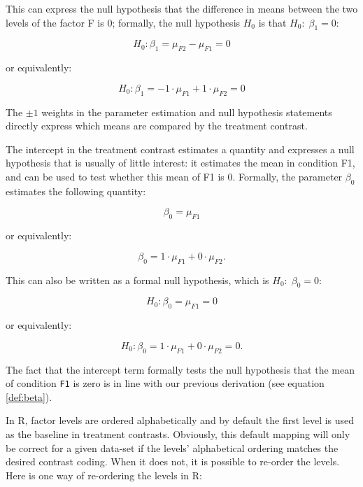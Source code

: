 \documentclass[12pt,]{krantz}
\theoremstyle{definition}
\theoremstyle{definition}
\theoremstyle{definition}
\theoremstyle{remark}
\begin{document}
This can express the null hypothesis that the difference in means
between the two levels of the factor F is \(0\); formally, the null
hypothesis \(H_0\) is that \(H_0: \; \beta_1 = 0\):

\begin{equation} \label{eq:f2minusf1}
H_0: \beta_1 = \mu_{F2} - \mu_{F1} = 0
\end{equation}

or equivalently:

\begin{equation}
H_0: \beta_1 = - 1 \cdot \mu_{F1} + 1 \cdot \mu_{F2} = 0
\end{equation}

The \(\pm 1\) weights in the parameter estimation and null hypothesis
statements directly express which means are compared by the treatment
contrast.

The intercept in the treatment contrast estimates a quantity and
expresses a null hypothesis that is usually of little interest: it
estimates the mean in condition F1, and can be used to test whether this
mean of F1 is \(0\). Formally, the parameter \(\beta_0\) estimates the
following quantity:

\begin{equation}
\beta_0 = \mu_{F1}
\end{equation}

\noindent
or equivalently:

\begin{equation}
\beta_0 = 1 \cdot \mu_{F1} + 0 \cdot \mu_{F2} .
\end{equation}

This can also be written as a formal null hypothesis, which is
\(H_0: \; \beta_0 = 0\):

\begin{equation}
H_0: \beta_0 = \mu_{F1} = 0
\end{equation}

\noindent
or equivalently:

\begin{equation} \label{eq:trmtcontrfirstmention}
H_0: \beta_0 = 1 \cdot \mu_{F1} + 0 \cdot \mu_{F2} = 0 .
\end{equation}

\noindent
The fact that the intercept term formally tests the null hypothesis that
the mean of condition \texttt{F1} is zero is in line with our previous
derivation (see equation \ref{def:beta}).

In R, factor levels are ordered alphabetically and by default the first
level is used as the baseline in treatment contrasts. Obviously, this
default mapping will only be correct for a given data-set if the levels'
alphabetical ordering matches the desired contrast coding. When it does
not, it is possible to re-order the levels. Here is one way of
re-ordering the levels in R:
\end{document}
